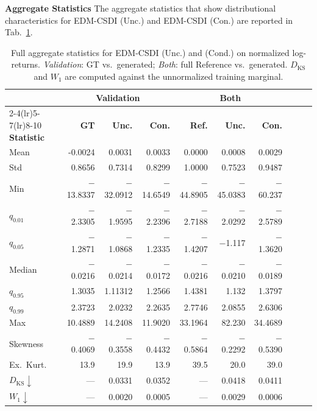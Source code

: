 \textbf{Aggregate Statistics} \quad The aggregate statistics that show distributional characteristics for EDM-CSDI (Unc.) and EDM-CSDI (Con.) are reported in Tab.\ \ref{tab:phase2_edm_uncond_cond_full}.

\begin{table}[h]
\centering
\footnotesize
\renewcommand{\arraystretch}{1.28}
\setlength{\tabcolsep}{3pt}
\begin{tabular}{
  l
  r r r          %
  r r r          %
  r r r          %
}
\toprule
& \multicolumn{3}{c}{\textbf{Validation}}
& \multicolumn{3}{c}{\textbf{Both}} \\
\cmidrule(lr){2-4}\cmidrule(lr){5-7}\cmidrule(lr){8-10}
\textbf{Statistic}
  & \textbf{GT} & \textbf{Unc.} & \textbf{Con.}
  & \textbf{Ref.} & \textbf{Unc.} & \textbf{Con.} \\
\midrule
Mean
  &  -0.0024 &  0.0031 &  0.0033
  &  0.0000 &  0.0008 &  0.0029 \\
Std
  &  0.8656 &  0.7314 &  0.8299
  &  1.0000 &  0.7523 &  0.9487 \\
Min
  & $-$13.8337 & $-$32.0912 & $-$14.6549
  & $-$44.8905 & $-$45.0383 & $-$60.237 \\
$q_{0.01}$
  & $-$2.3305 & $-$1.9595 & $-$2.2396
  & $-$2.7188 & $-$2.0292 & $-$2.5789 \\
$q_{0.05}$
  & $-$1.2871 & $-$1.0868 & $-$1.2335
  & $-$1.4207 & $-$1.117 & $-$1.3620 \\
Median
  & $-$0.0216 & $-$0.0214 & $-$0.0172
  & $-$0.0216 & $-$0.0210 & $-$0.0189 \\
$q_{0.95}$
  & 1.3035 & 1.11312 & 1.2566
  & 1.4381 & 1.132 & 1.3797 \\
$q_{0.99}$
  & 2.3723 & 2.0232 & 2.2635
  & 2.7746 & 2.0855 & 2.6306 \\
Max
  & 10.4889 & 14.2408 & 11.9020
  & 33.1964 & 82.230 & 34.4689 \\
Skewness
  & $-$0.4069 & $-$0.3558 & $-$0.4432
  & $-$0.5864 & $-$0.2292 & $-$0.5390 \\
Ex.\ Kurt.
  & 13.9 & 19.9 & 13.9
  & 39.5 & 20.0 & 39.0 \\
\midrule
$D_{\mathrm{KS}}\downarrow$
  & {---} & 0.0331 & 0.0352
  & {---} & 0.0418 & 0.0411 \\
$W_1\downarrow$
  & {---} & 0.0020 & 0.0005
  & {---} & 0.0029 & 0.0006 \\
\bottomrule
\end{tabular}
\caption{Full aggregate statistics for EDM-CSDI (Unc.) and (Cond.) on normalized log-returns. \emph{Validation}: GT vs.\ generated; \emph{Both}: full Reference vs.\ generated. $D_{\mathrm{KS}}$ and $W_1$ are computed against the unnormalized training marginal.}
\label{tab:phase2_edm_uncond_cond_full}
\end{table}

